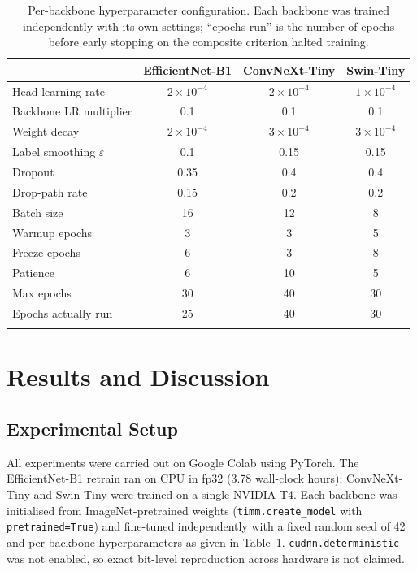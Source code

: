 \documentclass[pdflatex,sn-mathphys-num]{sn-jnl}%
\begin{document}
\begin{table}[htbp]
\caption{Per-backbone hyperparameter configuration. Each backbone was trained independently
with its own settings; ``epochs run'' is the number of epochs before early stopping on the
composite criterion halted training.}\label{tab:hyperparams}
\begin{tabular}{@{}lccc@{}}
\toprule
& EfficientNet-B1 & ConvNeXt-Tiny & Swin-Tiny \\
\midrule
Head learning rate & $2 \times 10^{-4}$ & $2 \times 10^{-4}$ & $1 \times 10^{-4}$ \\
Backbone LR multiplier & 0.1 & 0.1 & 0.1 \\
Weight decay & $2 \times 10^{-4}$ & $3 \times 10^{-4}$ & $3 \times 10^{-4}$ \\
Label smoothing $\varepsilon$ & 0.1 & 0.15 & 0.15 \\
Dropout & 0.35 & 0.4 & 0.4 \\
Drop-path rate & 0.15 & 0.2 & 0.2 \\
Batch size & 16 & 12 & 8 \\
Warmup epochs & 3 & 3 & 5 \\
Freeze epochs & 6 & 3 & 8 \\
Patience & 6 & 10 & 5 \\
Max epochs & 30 & 40 & 30 \\
Epochs actually run & 25 & 40 & 30 \\
\botrule
\end{tabular}
\end{table}

\section{Results and Discussion}\label{sec:results}

\subsection{Experimental Setup}\label{sec:expsetup}

All experiments were carried out on Google Colab using PyTorch. The EfficientNet-B1 retrain
ran on CPU in fp32 (3.78 wall-clock hours); ConvNeXt-Tiny and Swin-Tiny were trained on a
single NVIDIA T4. Each backbone was initialised from ImageNet-pretrained weights
(\texttt{timm.create\_model} with \texttt{pretrained=True}) and fine-tuned independently with
a fixed random seed of 42 and per-backbone hyperparameters as given in
Table~\ref{tab:hyperparams}. \texttt{cudnn.deterministic} was not enabled, so exact
bit-level reproduction across hardware is not claimed.
\end{document}
